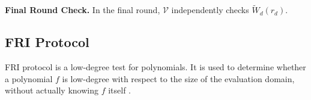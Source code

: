 \noindent\textbf{Final Round Check.}
In the final round, $\mathcal{V}$ independently checks $ \widetilde{W}_{d}(r_{d})$.















\subsection{FRI Protocol}
FRI protocol is a low-degree test for polynomials. It is used to determine whether a polynomial $f$ is low-degree with respect to the size of the evaluation domain,  without actually knowing $f$ itself \cite{ben2018fast,habock2022summary}. 

